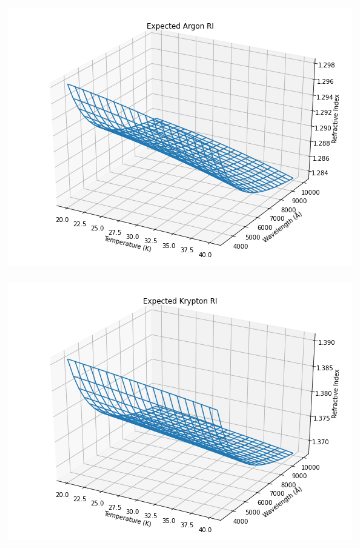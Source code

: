 \documentclass[letterpaper,12pt]{article}
\begin{document}
\begin{figure}[h!]
	\begin{subfigure}[t]{\linewidth}
		\centering
		\includegraphics[width=\textwidth,height=\textheight,keepaspectratio]{arex.png}
	\end{subfigure}
	\begin{subfigure}[t]{\linewidth}
		\centering
		\includegraphics[width=\textwidth,height=\textheight,keepaspectratio]{krex.png}
	\end{subfigure}
\end{figure}
\end{document}
